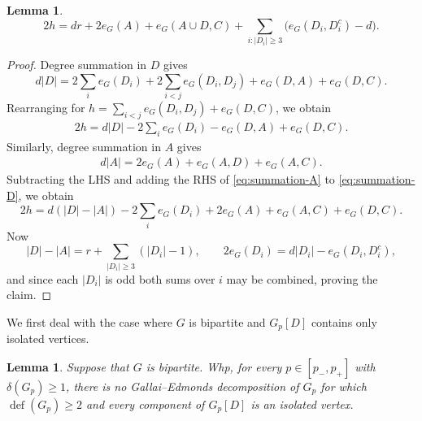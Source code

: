 \documentclass[10pt,a4paper]{article}
\newtheorem{lemma}[thm]{Lemma}
\newcommand{\defi}{\operatorname{def}}
\begin{document}
\begin{lemma}\label{lem:ge-boundary-identity}
\begin{equation}\label{eq:ge-exact}
 2h=dr+2e_G(A)+e_G(A\cup D,C)  +\sum_{i:|D_i|\ge3}\bigl(e_G(D_i,D_i^c)-d\bigr).
\end{equation}
\end{lemma}

\begin{proof}
Degree summation in $D$ gives
\[
    d |D|= 2 \sum_{i} e_G(D_i)+ 2 \sum_{i<j} e_G(D_i, D_j) + e_G(D, A) + e_G(D, C).
\]
Rearranging for $h=\sum_{i<j}e_G(D_i,D_j)+e_G(D,C)$, we obtain
\begin{align} \label{eq:summation-D}
    2h=d|D|-2\sum_ie_G(D_i)-e_G(D,A)+e_G(D,C).
\end{align}
Similarly, degree summation in $A$ gives
\begin{align} \label{eq:summation-A}
    d |A| = 2 e_G(A) + e_G(A, D) + e_G(A, C).
\end{align}
Subtracting the LHS and adding the RHS of \eqref{eq:summation-A} to \eqref{eq:summation-D}, we obtain
\[
2h= d( |D|-|A|) - 2 \sum_{i} e_G(D_i) + 2 e_G(A) + e_G(A, C) + e_G(D, C).
\]
Now
\[
 |D|-|A|=r+\sum_{|D_i|\ge3}(|D_i|-1),  \qquad 2e_G(D_i)=d|D_i|-e_G(D_i,D_i^c),
\]
and since each $|D_i|$ is odd both sums over $i$ may be combined, proving the claim.
\end{proof}

We first deal with the case where $G$ is bipartite and $G_p[D]$ contains only isolated vertices.
\begin{lemma}\label{lem:bipartite-singletons}
Suppose that $G$ is bipartite.
Whp, for every $p\in[p_-,p_+]$ with $\delta(G_p)\ge1$, there is no Gallai--Edmonds decomposition of $G_p$ for which $\defi(G_p)\ge2$ and every component of $G_p[D]$ is an isolated vertex.
\end{lemma}
\end{document}
